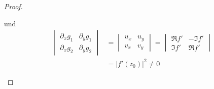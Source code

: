 \documentclass[a4paper,10pt]{scrbook}
\begin{document}
\begin{theorem}
\begin{proof}
\begin{enum-arab}
      \item und
      \begin{align*}
        \begin{vmatrix}
          \partial_x g_1 & \partial_y g_1 \\
          \partial_x g_2 & \partial_y g_2
        \end{vmatrix}
        &=
        \begin{vmatrix}
          u_x & u_y \\
          v_x & v_y
        \end{vmatrix}
        =
        \begin{vmatrix}
          \Re f' & -\Im f' \\
          \Im f' & \Re f'
        \end{vmatrix}
        \\
        &= |f'(z_0)|^2 \neq 0
      \end{align*}


\end{enum-arab}
\end{proof}
\end{theorem}
\end{document}
